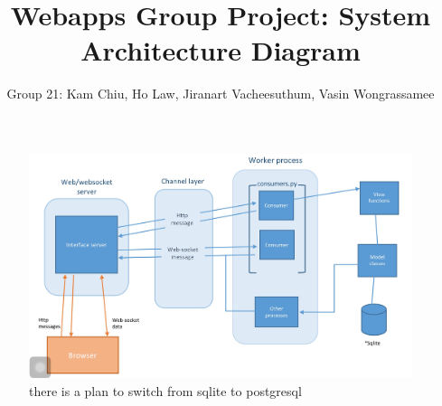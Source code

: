 \documentclass[11pt]{article}
\begin{document}
\title{Webapps Group Project: System Architecture Diagram}
\author{Group 21: Kam Chiu, Ho Law, Jiranart Vacheesuthum, Vasin Wongrassamee}

\maketitle

\begin{figure}[h]
\begin{minipage}{1.0\textwidth}
  \centering
  \includegraphics[width=.9\linewidth]{systemdiagram.jpg}
  \caption{there is a plan to switch from sqlite to postgresql}
\end{minipage}
\end{figure}
\end{document}

